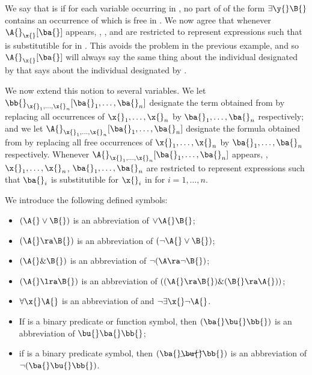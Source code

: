 We say that \ba{} is  \x{}  \A{} if for each variable \y{} occurring in \ba{}, no part of \A{} of the form $\exists \y{} \B{}$ contains an occurrence of \x{} which is free in \A{}.
We now agree that whenever $\A{}_\x{} [\ba{}]$ appears, \A{}, \x{}, and \ba{} are restricted to represent expressions such that \ba{} is substitutible for \ba{} in \A{}.
This avoids the problem in the previous example, and so $\A{}_\x{} [\ba{}]$ will always say the same thing about the individual designated by \ba{} that \A{} says about the individual designated by \x{}.

We now extend this notion to several variables.
We let $\bb{}_{\x{}_1, \dots, \x{}_n} [\ba{}_1, \dots, \ba{}_n]$ designate the term obtained from \bb{} by replacing all occurrences of $\x{}_1, \dots, \x{}_n$ by $\ba{}_1, \dots, \ba{}_n$ respectively;
and we let $\A{}_{\x{}_1, \dots, \x{}_n} [\ba{}_1, \dots, \ba{}_n]$ designate the formula obtained from \A{} by replacing all free occurrences of $\x{}_1, \dots, \x{}_n$ by $\ba{}_1, \dots, \ba{}_n$ respectively.
Whenever $\A{}_{\x{}_1, \dots, \x{}_n} [\ba{}_1, \dots, \ba{}_n]$ appears, \A{}, $\x{}_1, \dots, \x{}_n$, $\ba{}_1, \dots, \ba{}_n$ are restricted to represent expressions such that $\ba{}_i$ is substitutible for $\x{}_i$ in \A{} for $i = 1, \dots, n$.


We introduce the following defined symbols:
\begin{itemize}
    \item $(\A{} \vee \B{})$ is an abbreviation of $\vee \A{} \B{}$;
    \item $(\A{} \ra \B{})$ is an abbreviation of $(\neg \A{} \vee \B{})$;
    \item $(\A{} \& \B{})$ is an abbreviation of $\neg (\A \ra \neg \B{})$;
    \item $(\A{} \lra \B{})$ is an abbreviation of $((\A{} \ra \B{}) \& (\B{} \ra \A{}))$;
    \item $\forall \x{} \A{}$ is an abbreviation of and $\neg \exists \x{} \neg \A{}$.
    \item If \bu{} is a binary predicate or function symbol, then $(\ba{} \bu{} \bb{})$ is an abbreviation of $\bu{} \ba{} \bb{}$;
    \item if \bu{} is a binary predicate symbol, then $(\ba{} \cancel{\bu{}} \bb{})$ is an abbreviation of $\neg (\ba{} \bu{} \bb{})$.
\end{itemize}

